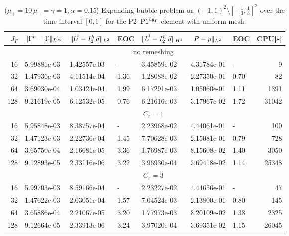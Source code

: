 \begin{table}
\center
\hspace*{-3.25cm}
\begin{tabular}{rllllllr}
\hline
$J_\Gamma$ & $\|\Gamma^h - \Gamma\|_{L^\infty}$ & $\|\vec U - I^h_{2}\,\vec u\|_{L^2}$ & EOC & $\|\vec U - I^h_{2}\,\vec u\|_{H^1}$ & $\|P - p\|_{L^2}$ & EOC
& CPU[s] \\
\hline
& \multicolumn{7}{c}{no remeshing} \\
\hline
 16 & 5.99881e-03 & 1.42557e-03 &    - & 3.45859e-02 & 4.31784e-01 &    - &
9 \\
 32 & 1.47936e-03 & 4.11514e-04 & 1.36 & 1.28088e-02 & 2.27350e-01 & 0.70 &
82 \\
 64 & 3.69030e-04 & 1.03424e-04 & 1.99 & 6.17291e-03 & 1.05060e-01 & 1.11 &
1391 \\
128 & 9.21619e-05 & 6.12532e-05 & 0.76 & 6.21616e-03 & 3.17967e-02 & 1.72 &
31042 \\
\hline
& \multicolumn{7}{c}{$C_r=1$} \\
\hline
 16 & 5.95848e-03 & 8.38757e-04 &    - & 2.23968e-02 & 4.44061e-01 &    - &
100 \\
 32 & 1.47123e-03 & 2.22736e-04 & 1.45 & 7.70628e-03 & 2.15081e-01 & 0.79 &
728 \\
 64 & 3.65750e-04 & 2.16681e-05 & 3.36 & 1.76987e-03 & 8.15608e-02 & 1.40 &
3050 \\
128 & 9.12893e-05 & 2.33116e-06 & 3.22 & 3.96930e-04 & 3.69418e-02 & 1.14 &
25348 \\
\hline
& \multicolumn{7}{c}{$C_r=3$} \\
\hline
 16 & 5.99703e-03 & 8.59166e-04 &    - & 2.23227e-02 & 4.44656e-01 &    - &
47 \\
 32 & 1.47622e-03 & 2.03051e-04 & 1.57 & 7.04524e-03 & 2.13800e-01 & 0.80 &
145 \\
 64 & 3.65886e-04 & 2.21067e-05 & 3.20 & 1.77973e-03 & 8.20109e-02 & 1.38 &
2325 \\
128 & 9.12664e-05 & 2.33913e-06 & 3.24 & 3.97020e-04 & 3.69351e-02 & 1.15 &
26045 \\
\hline
\end{tabular}
\hspace*{-3.25cm}
\caption[Stokes expanding bubble uniform mesh errors P2--$\pdg$]
{($\mu_+ = 10\,\mu_- = \gamma = 1,\alpha = 0.15$) Expanding bubble
problem on $(-1,1)^2\setminus[-\frac{1}{3},\frac{1}{3}]^2$ over the time
interval $[0,1]$ for the P2--$\pdg$ element with uniform mesh.}
\label{tab:expandingbubble2Dp2p1dg}
\end{table}
